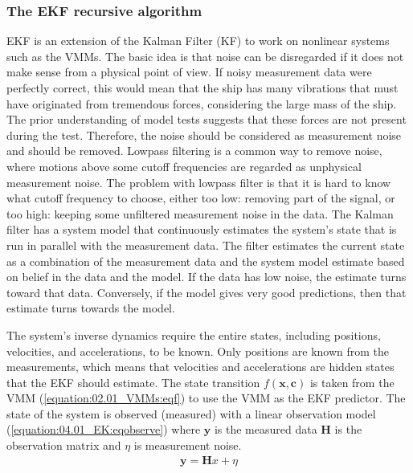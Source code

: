 \documentclass[review]{elsarticle}
\begin{document}
\subsubsection{The EKF recursive algorithm}
\label{\detokenize{04.01_EK:the-ekf-recursive-algorithm}}

EKF is an extension of the Kalman Filter (KF) to work on nonlinear systems such as the VMMs. The basic idea is that noise can be disregarded if it does not make sense from a physical point of view. If noisy measurement data were perfectly correct, this would mean that the ship has many vibrations that must have originated from tremendous forces, considering the large mass of the ship. The prior understanding of model tests suggests that these forces are not present during the test. Therefore, the noise should be considered as measurement noise and should be removed. Low\sphinxhyphen{}pass filtering is a common way to remove noise, where motions above some cut\sphinxhyphen{}off frequencies are regarded as unphysical measurement noise. The problem with low\sphinxhyphen{}pass filter is that it is hard to know what cut\sphinxhyphen{}off frequency to choose, either too low: removing part of the signal, or too high: keeping some unfiltered measurement noise in the data. The Kalman filter has a system model that continuously estimates the system's state that is run in parallel with the measurement data. The filter estimates the current state as a combination of the measurement data and the system model estimate based on belief in the data and the model. If the data has low noise, the estimate turns toward that data. Conversely, if the model gives very good predictions, then that estimate turns towards the model.

  
The system's inverse dynamics require the entire states, including positions, velocities, and accelerations, to be known. Only positions are known from the measurements, which means that velocities and accelerations are hidden states that the EKF should estimate.
The state transition \(f(\mathbf{x},\mathbf{c})\) is taken from the VMM (\autoref{equation:02.01_VMMs:eqf}) to use the VMM as the EKF predictor.
The state of the system is observed (measured) with a linear observation model (\autoref{equation:04.01_EK:eqobserve}) where \(\mathbf{y}\) is the measured data \(\mathbf{H}\) is the observation matrix and \(\eta\) is measurement noise.
\begin{equation}\label{equation:04.01_EK:eqobserve}
\begin{split}\mathbf{y} = \mathbf{H} x + \eta\end{split}
\end{equation}
  
\end{document}
